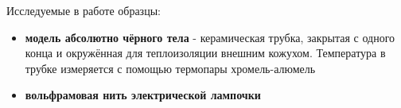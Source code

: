 \documentclass[a4paper,12pt]{article} %
\begin{document}
Исследуемые в работе образцы:
\begin{itemize}
    \item \textbf{модель абсолютно чёрного тела} - керамическая трубка, закрытая с одного конца и окружённая для теплоизоляции внешним кожухом. Температура в трубке измеряется с помощью термопары хромель-алюмель
    \item \textbf{вольфрамовая нить электрической лампочки}
\end{itemize}

\newpage
\end{document}
